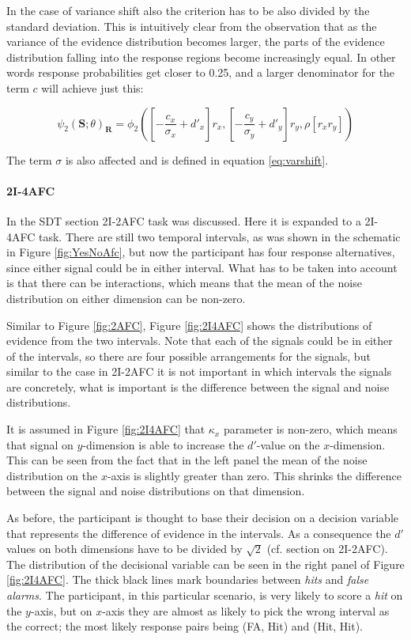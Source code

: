 \documentclass{article}\usepackage{knitr}
\begin{document}
In the case of variance shift also the criterion has to be also divided by the standard deviation. This is intuitively clear from the observation that as the variance of the evidence distribution becomes larger, the parts of the evidence distribution falling into the response regions become increasingly equal. In other words response probabilities get closer to 0.25, and a larger denominator for the term $c$ will achieve just this:

\begin{equation}
\psi_2(\bm{S}; \theta)_{\bm{R}} = \phi_2([-\frac{c_x}{\sigma_x} + d'_x]r_x, [-\frac{c_y}{\sigma_y} + d'_y] r_y, \rho [r_x r_y])
\label{eq:generalPfun}
\end{equation}  

The term $\sigma$ is also affected  and is defined in equation \ref{eq:varshift}.

\paragraph{2I-4AFC}

In the SDT section 2I-2AFC task was discussed. Here it is expanded to a 2I-4AFC task. There are still two temporal intervals, as was shown in the schematic in Figure \ref{fig:YesNoAfc}, but now the participant has four response alternatives, since either signal could be in either interval. What has to be taken into account is that there can be interactions, which means that the mean of the noise distribution on either dimension can be non-zero. 

Similar to Figure \ref{fig:2AFC}, Figure \ref{fig:2I4AFC} shows the distributions of evidence from the two intervals. Note that each of the signals could be in either of the intervals, so there are four possible arrangements for the signals, but similar to the case in 2I-2AFC it is not important in which intervals the signals are concretely, what is important is the difference between the signal and noise distributions. 

It is assumed in Figure \ref{fig:2I4AFC} that $\kappa_x$ parameter is non-zero, which means that signal on $y$-dimension is able to increase the $d'$-value on the $x$-dimension. This can be seen from the fact that in the left panel the mean of the noise distribution on the $x$-axis is slightly greater than zero. This shrinks the difference between the signal and noise distributions on that dimension.

As before, the participant is thought to base their decision on a decision variable that represents the difference of evidence in the intervals. As a consequence the $d'$ values on both dimensions have to be divided by $\sqrt{2}$ (cf. section on 2I-2AFC). The distribution of the decisional variable can be seen in the right panel of Figure \ref{fig:2I4AFC}. The thick black lines mark boundaries between \textit{hits} and \textit{false alarms}. The participant, in this particular scenario, is very likely to score a \textit{hit} on the $y$-axis, but on $x$-axis they are almost as likely to pick the wrong interval as the correct; the most likely response pairs being (FA, Hit) and (Hit, Hit).
\end{document}
